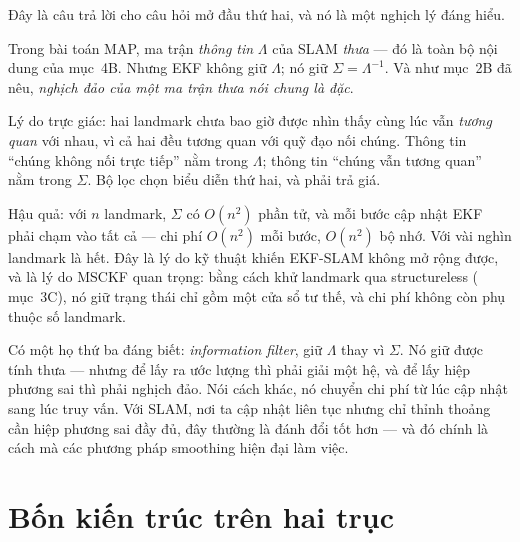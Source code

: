 \documentclass[../../vslam.tex]{subfiles}
\begin{document}
Đây là câu trả lời cho câu hỏi mở đầu thứ hai, và nó là một nghịch lý đáng hiểu.

Trong bài toán MAP, ma trận \emph{thông tin} \(\Lambda\) của SLAM \emph{thưa} --- đó là toàn bộ nội dung của  mục~4B. Nhưng EKF không giữ \(\Lambda\); nó giữ \(\Sigma = \Lambda^{-1}\). Và như  mục~2B đã nêu, \emph{nghịch đảo của một ma trận thưa nói chung là đặc}.

Lý do trực giác: hai landmark chưa bao giờ được nhìn thấy cùng lúc vẫn \emph{tương quan} với nhau, vì cả hai đều tương quan với quỹ đạo nối chúng. Thông tin ``chúng không nối trực tiếp'' nằm trong \(\Lambda\); thông tin ``chúng vẫn tương quan'' nằm trong \(\Sigma\). Bộ lọc chọn biểu diễn thứ hai, và phải trả giá.

Hậu quả: với \(n\) landmark, \(\Sigma\) có \(O(n^2)\) phần tử, và mỗi bước cập nhật EKF phải chạm vào tất cả --- chi phí \(O(n^2)\) mỗi bước, \(O(n^2)\) bộ nhớ. Với vài nghìn landmark là hết. Đây là lý do kỹ thuật khiến EKF-SLAM không mở rộng được, và là lý do MSCKF quan trọng: bằng cách khử landmark qua structureless ( mục~3C), nó giữ trạng thái chỉ gồm một cửa sổ tư thế, và chi phí không còn phụ thuộc số landmark.

Có một họ thứ ba đáng biết: \emph{information filter}, giữ \(\Lambda\) thay vì \(\Sigma\). Nó giữ được tính thưa --- nhưng để lấy ra ước lượng thì phải giải một hệ, và để lấy hiệp phương sai thì phải nghịch đảo. Nói cách khác, nó chuyển chi phí từ lúc cập nhật sang lúc truy vấn. Với SLAM, nơi ta cập nhật liên tục nhưng chỉ thỉnh thoảng cần hiệp phương sai đầy đủ, đây thường là đánh đổi tốt hơn --- và đó chính là cách mà các phương pháp smoothing hiện đại làm việc.

\section{Bốn kiến trúc trên hai trục}
\end{document}
